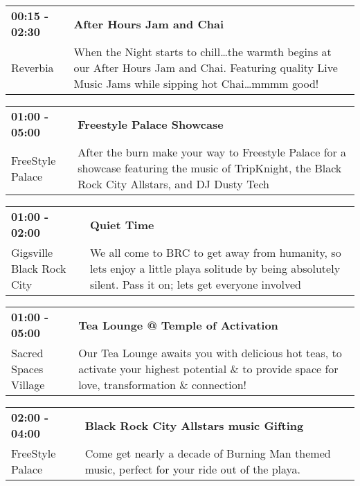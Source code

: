 \begin{tabular}{ p{1in} p{2.2in} }
    \textbf{00:15 - 02:30} & \textbf{After Hours Jam and Chai} \\
    Reverbia \newline  & When the Night starts to chill\ldots the warmth begins at our After Hours Jam and Chai.  Featuring quality Live Music Jams while sipping hot Chai\ldots mmmm good! \\
    \hline 
\end{tabular}
    
\begin{tabular}{ p{1in} p{2.2in} }
    \textbf{01:00 - 05:00} & \textbf{Freestyle Palace Showcase} \\
    FreeStyle Palace \newline  & After the burn make your way to Freestyle Palace for a showcase featuring the music of TripKnight, the Black Rock City Allstars, and DJ Dusty Tech \\
    \hline 
\end{tabular}
    
\begin{tabular}{ p{1in} p{2.2in} }
    \textbf{01:00 - 02:00} & \textbf{Quiet Time} \\
    Gigsville \newline Black Rock City & We all come to BRC to get away from humanity, so lets enjoy a little playa solitude by being absolutely silent. Pass it on; lets get everyone involved \\
    \hline 
\end{tabular}
    
\begin{tabular}{ p{1in} p{2.2in} }
    \textbf{01:00 - 05:00} & \textbf{Tea Lounge @ Temple of Activation } \\
    Sacred Spaces Village \newline  & Our Tea Lounge awaits you with delicious hot teas, to activate your highest potential \& to provide space for love, transformation \& connection! \\
    \hline 
\end{tabular}
    
\begin{tabular}{ p{1in} p{2.2in} }
    \textbf{02:00 - 04:00} & \textbf{Black Rock City Allstars music Gifting} \\
    FreeStyle Palace \newline  & Come get nearly a decade of Burning Man themed music, perfect for your ride out of the playa. \\
    \hline 
\end{tabular}
    
